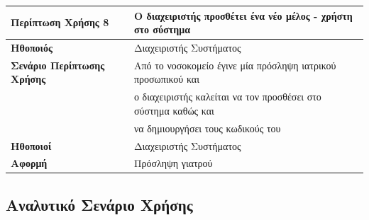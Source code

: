 \documentclass{article}
\newcommand\T{\rule{0pt}{2.6ex}}       %
\newcommand\B{\rule[-1.2ex]{0pt}{0pt}}
\begin{document}
\begin{center}
     \begin{tabular}{|l|l|}
     \hline
      \textbf{Περίπτωση Χρήσης 8} & Ο διαχειριστής προσθέτει ένα νέο μέλος - χρήστη στο σύστημα \T\B \\ 
      \hline
      \textbf{Ηθοποιός} & Διαχειριστής Συστήματος \T\B \\
      \hline
      \textbf{Σενάριο Περίπτωσης Χρήσης} & Από το νοσοκομείο έγινε μία πρόσληψη ιατρικού προσωπικού και \T \\& ο διαχειριστής καλείται να τον προσθέσει στο σύστημα καθώς και \\& να δημιουργήσει τους κωδικούς του \B \\
      \hline
      \textbf{Ηθοποιοί} & Διαχειριστής Συστήματος \T\B \\
      \hline
      \textbf{Αφορμή} & Πρόσληψη γιατρού \T\B \\
      \hline
     \end{tabular}
 \end{center}
 
 \subsection{Αναλυτικό Σενάριο Χρήσης}
\end{document}

